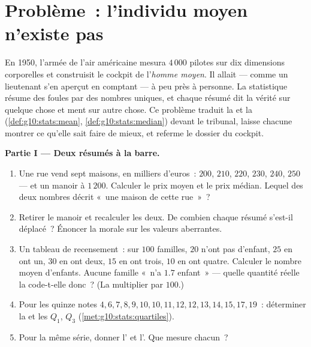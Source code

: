 \section{Problème~: l'individu moyen n'existe pas}

\begin{problem}
\label{pb:g10:stats:1}
En 1950, l'armée de l'air américaine mesura $4\,000$ pilotes sur dix
dimensions corporelles et construisit le cockpit de l'\emph{homme
moyen}. Il allait --- comme un lieutenant s'en aperçut en comptant
--- à peu près à personne. La statistique résume des foules par des
nombres uniques, et chaque résumé dit la vérité sur quelque chose et
ment sur autre chose. Ce problème traduit la  et la 
(\cref{def:g10:stats:mean}, \cref{def:g10:stats:median}) devant le
tribunal, laisse chacune montrer ce qu'elle sait faire de mieux, et
referme le dossier du cockpit.

\medskip
\noindent\textbf{Partie I --- Deux résumés à la barre.}
\begin{enumerate}
  \item Une rue vend sept maisons, en milliers d'euros~: $200$,
        $210$, $220$, $230$, $240$, $250$ --- et un manoir à
        $1\,200$. Calculer le prix moyen et le prix médian. Lequel
        des deux nombres décrit «~une maison de cette rue~»~?
  \item Retirer le manoir et recalculer les deux. De combien chaque
        résumé s'est-il déplacé~? Énoncer la morale sur les valeurs
        aberrantes.
  \item Un tableau de recensement~: sur $100$ familles, $20$ n'ont
        pas d'enfant, $25$ en ont un, $30$ en ont deux, $15$ en ont
        trois, $10$ en ont quatre. Calculer le nombre moyen
        d'enfants. Aucune famille «~n'a $1.7$ enfant~» --- quelle
        quantité réelle la  code-t-elle donc~? (La
        multiplier par $100$.)
  \item Pour les quinze notes
        $4, 6, 7, 8, 9, 10, 10, 11, 12, 12, 13, 14, 15, 17, 19$~:
        déterminer la  et les  $Q_1$, $Q_3$
        (\cref{met:g10:stats:quartiles}).
  \item Pour la même série, donner l' et l'. Que mesure chacun~?
\end{enumerate}


\end{problem}
